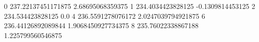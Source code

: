 0 237.22137451171875 2.68695068359375
1 234.4034423828125 -0.1309814453125
2 234.534423828125 0.0
4 236.5591278076172 2.0247039794921875
6 236.44126892089844 1.9068450927734375
8 235.76022338867188 1.225799560546875
